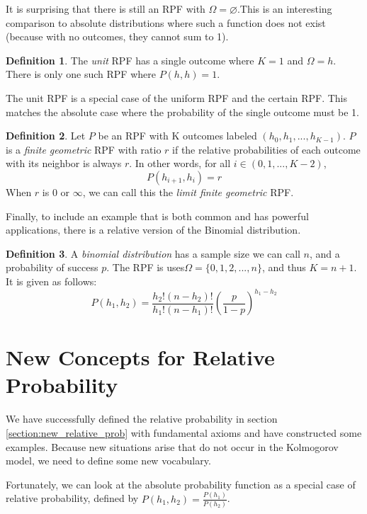 \documentclass[twoside]{article}
\theoremstyle{plain}%
\theoremstyle{definition}
\newtheorem{definition}{Definition}[section]
\theoremstyle{remark}
\begin{document}
It is surprising that there is still an RPF with \(\Omega = \varnothing\).This is an interesting comparison to absolute distributions where such a function does not exist (because with no outcomes, they cannot sum to 1).

\begin{definition}
The \textit{unit} RPF has a single outcome where \(K = 1\) and \(\Omega = h\). There is only one such RPF where \(P(h, h) = 1\).
\end{definition}

The unit RPF is a special case of the uniform RPF and the certain RPF. This matches the absolute case where the probability of the single outcome must be 1.

\begin{definition}
Let \(P\) be an RPF with K outcomes labeled \((h_0, h_1, ..., h_{K-1})\). \(P\) is a \textit{finite geometric} RPF with ratio \(r\) if the relative probabilities of each outcome with its neighbor is always \(r\). In other words, for all \(i \in (0, 1, ..., K-2)\),
\[P(h_{i+1}, h_i) = r\]
When \(r\) is 0 or \(\infty\), we can call this the \textit{limit finite geometric} RPF.
\end{definition}

Finally, to include an example that is both common and has powerful applications, there is a relative version of the Binomial distribution.

\begin{definition}
A \textit{binomial distribution} has a sample size we can call \(n\), and a probability of success \(p\). The RPF is uses\(\Omega = \{0, 1, 2, ..., n\}\), and thus \(K = n + 1\). It is given as follows:
\[P(h_1, h_2) = \frac{h_2!(n-h_2)!}{h_1!(n-h_1)!}\left(\frac{p}{1-p}\right)^{h_1 - h_2}\]
\end{definition}


\section{New Concepts for Relative Probability}

We have successfully defined the relative probability in section \ref{section:new_relative_prob} with fundamental axioms and have constructed some examples. Because new situations arise that do not occur in the Kolmogorov model, we need to define some new vocabulary.

Fortunately, we can look at the absolute probability function as a special case of relative probability, defined by \(P(h_1, h_2) = \frac{P(h_1)}{P(h_2)}\).
\end{document}
